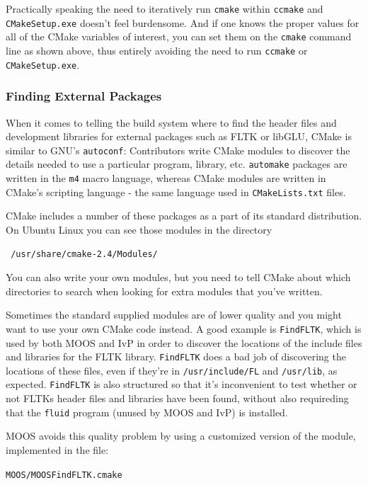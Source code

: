 \documentclass[letterpaper,10pt]{article}
\begin{document}
Practically speaking the need to iteratively run \verb|cmake| within \verb|ccmake| and \verb|CMakeSetup.exe| doesn't feel burdensome.  And if one knows the proper values for all
of the CMake variables of interest, you can set them on the \verb|cmake| command line 
as shown above, thus entirely avoiding the need to run \verb|ccmake| or
\verb|CMakeSetup.exe|.

\subsubsection{Finding External Packages}
When it comes to telling the build system where to find the header files and
development libraries for external packages such as FLTK or libGLU, CMake is
similar to GNU's \verb|autoconf|:  Contributors write CMake modules to discover 
the details needed to use a particular program, library, etc.  \verb|automake|
packages are written in the \verb|m4| macro language, whereas CMake modules are
written in CMake's scripting language - the same language used in 
\verb|CMakeLists.txt| files.  

CMake includes a number of these packages as a 
part of its standard distribution.  On Ubuntu Linux you can see those modules
in the directory 

\begin{verbatim}
 /usr/share/cmake-2.4/Modules/
\end{verbatim} 


You can also write your
own modules, but you need to tell CMake about which directories to search when
looking for extra modules that you've written.

Sometimes the standard supplied modules are of lower quality and you might want
to use your own CMake code instead.  A good example is \verb|FindFLTK|, 
which is used by both MOOS and IvP in order to discover the locations of the
include files and libraries for the FLTK library.  \verb|FindFLTK| does a bad
job of discovering the locations of these files, even if they're in
\verb|/usr/include/FL| and \verb|/usr/lib|, as expected.  \verb|FindFLTK| is 
also structured so that it's inconvenient to test whether or not FLTKs header
files and libraries have been found, without also requireding that the 
\verb|fluid| program (unused by MOOS and IvP) is installed.

MOOS avoids this quality problem by using a customized version of the module,
implemented in the file:

\verb|MOOS/MOOSFindFLTK.cmake|
\end{document}
